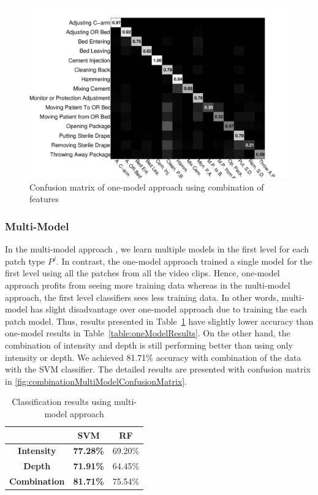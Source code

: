 \documentclass[a4paper, 10pt, conference]{ieeeconf}      %
\begin{document}
\begin{figure}[H]%
\begin{center}
\includegraphics[scale=0.20]{Figures/combination-onemodel}
\end{center}
\caption{Confusion matrix of one-model approach using combination of features
\label{fig:combinationOneModelConfusionMatrix}}
\end{figure}

\subsubsection{Multi-Model}
\label{section:MultiModelExperiments}
In the multi-model approach , we learn multiple models in the first level for each patch type $P^{j}$. In contrast, the one-model approach trained a single model for the first level using all the patches from all the video clips.
Hence, one-model approach profits from seeing more training data whereas in the multi-model approach, the first level classifiers sees less training data. In other words, multi-model has slight disadvantage over one-model approach due to training the each patch model. Thus, results presented in Table~\ref{table:multiModelResults} have slightly lower accuracy than one-model results in Table~\ref{table:oneModelResults}. On the other hand, the combination of intensity and depth is still performing better than using only intensity or depth. We achieved 81.71\% accuracy with combination of the data with the SVM classifier. The detailed results are presented with confusion matrix in \ref{fig:combinationMultiModelConfusionMatrix}.
            
\begin{table}[H]
\centering
\begin{tabular}{|c|c|c|}
\hline
                     & \textbf{SVM}     & \textbf{RF} \\ \hline
\textbf{Intensity}   & \textbf{77.28\%} & 69.20\%     \\ \hline
\textbf{Depth}       & \textbf{71.91\%} & 64.45\%     \\ \hline
\textbf{Combination} & \textbf{81.71\%} & 75.54\%     \\ \hline
\end{tabular}
\caption{Classification results using multi-model approach}
\label{table:multiModelResults}
\end{table}
\end{document}
